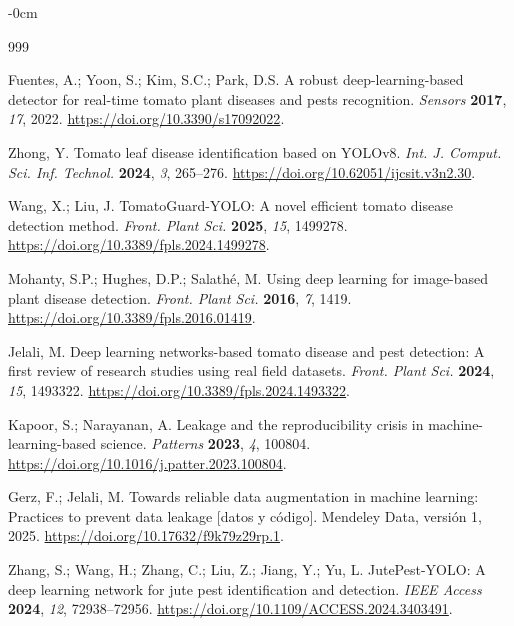 \documentclass[sensors,article,submit,pdftex,moreauthors]{Definitions/mdpi}
\begin{document}
\begin{adjustwidth}{-\extralength}{0cm}
\begin{thebibliography}{999}

Fuentes, A.; Yoon, S.; Kim, S.C.; Park, D.S. A robust deep-learning-based detector for real-time tomato plant diseases and pests recognition. {\em Sensors} {\bf 2017}, {\em 17}, 2022. \url{https://doi.org/10.3390/s17092022}.

Zhong, Y. Tomato leaf disease identification based on YOLOv8. {\em Int. J. Comput. Sci. Inf. Technol.} {\bf 2024}, {\em 3}, 265--276. \url{https://doi.org/10.62051/ijcsit.v3n2.30}.

Wang, X.; Liu, J. TomatoGuard-YOLO: A novel efficient tomato disease detection method. {\em Front. Plant Sci.} {\bf 2025}, {\em 15}, 1499278. \url{https://doi.org/10.3389/fpls.2024.1499278}.

Mohanty, S.P.; Hughes, D.P.; Salath\'e, M. Using deep learning for image-based plant disease detection. {\em Front. Plant Sci.} {\bf 2016}, {\em 7}, 1419. \url{https://doi.org/10.3389/fpls.2016.01419}.

Jelali, M. Deep learning networks-based tomato disease and pest detection: A first review of research studies using real field datasets. {\em Front. Plant Sci.} {\bf 2024}, {\em 15}, 1493322. \url{https://doi.org/10.3389/fpls.2024.1493322}.

Kapoor, S.; Narayanan, A. Leakage and the reproducibility crisis in machine-learning-based science. {\em Patterns} {\bf 2023}, {\em 4}, 100804. \url{https://doi.org/10.1016/j.patter.2023.100804}.

Gerz, F.; Jelali, M. Towards reliable data augmentation in machine learning: Practices to prevent data leakage [datos y código]. Mendeley Data, versión 1, 2025. \url{https://doi.org/10.17632/f9k79z29rp.1}.

Zhang, S.; Wang, H.; Zhang, C.; Liu, Z.; Jiang, Y.; Yu, L. JutePest-YOLO: A deep learning network for jute pest identification and detection. {\em IEEE Access} {\bf 2024}, {\em 12}, 72938--72956. \url{https://doi.org/10.1109/ACCESS.2024.3403491}.


\end{thebibliography}
\end{adjustwidth}
\end{document}
